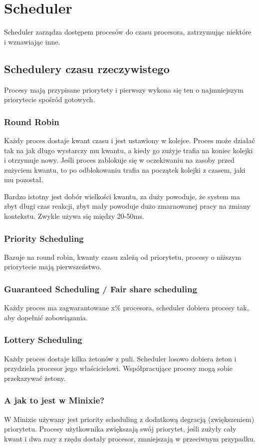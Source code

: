 \section{Scheduler}
Scheduler zarządza dostępem procesów do czasu procesora, zatrzymując niektóre i wznawiając inne.
\subsection{Schedulery czasu rzeczywistego}
Procesy mają przypisane priorytety i pierwszy wykona się ten o najmniejszym priorytecie spośród gotowych.
\subsubsection{Round Robin}
Każdy proces dostaje kwant czasu i jest ustawiony w kolejce. Proces może działać tak na jak długo wystarczy mu kwantu, a kiedy go zużyje trafia na koniec kolejki i otrzymuje nowy. Jeśli proces zablokuje się w oczekiwaniu na zasoby przed zużyciem kwantu, to po odblokowaniu trafia na początek kolejki z czasem, jaki mu pozostał.

Bardzo istotny jest dobór wielkości kwantu, za duży powoduje, że system ma zbyt długi czas reakcji, zbyt mały powoduje dużo zmarnowanej pracy na zmiany kontekstu. Zwykle używa się między 20-50ms.
\subsubsection{Priority Scheduling}
Bazuje na round robin, kwanty czasu zależą od priorytetu, procesy o niższym priorytecie mają pierwszeństwo.
\subsubsection{Guaranteed Scheduling / Fair share scheduling}
Każdy proces ma zagwarantowane x\% procesora, scheduler dobiera procesy tak, aby dopełnić zobowiązania.
\subsubsection{Lottery Scheduling}
Każdy proces dostaje kilka żetonów z puli. Scheduler losowo dobiera żeton i przydziela procesor jego właścicielowi. Współpracujące procesy mogą sobie przekazywać żetony.
\subsubsection{A jak to jest w Minixie?}
W Minixie używany jest priority scheduling z dodatkową degracją (zwiększeniem) priorytetu. Procesy użytkownika zwiększają swój priorytet, jeśli zużyły cały kwant i dwa razy z rzędu dostały procesor, zmniejszają w przeciwnym przypadku.
